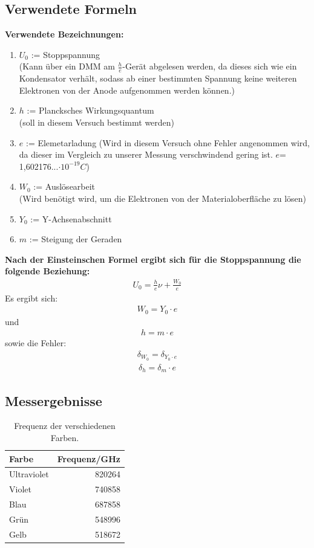 \documentclass[12px]{scrartcl}
\begin{document}
\subsection{Verwendete Formeln}
\textbf{Verwendete Bezeichnungen:}
\begin{enumerate}
\item $U_0$ := Stoppspannung\\ (Kann über ein DMM am $\frac{h}{e}$-Gerät abgelesen werden, da dieses sich wie ein Kondensator verhält, sodass ab einer bestimmten Spannung keine weiteren Elektronen von der Anode aufgenommen werden können.)
\item $h$ := Plancksches Wirkungsquantum\\
(soll in diesem Versuch bestimmt werden)
\item $e$ := Elemetarladung
(Wird in diesem Versuch ohne Fehler angenommen wird, da dieser im Vergleich zu unserer Messung verschwindend gering ist. $e$= 1,602176...$\cdot10^{-19}C$)
\item $W_0$ := Auslösearbeit\\
(Wird benötigt wird, um die Elektronen von der Materialoberfläche zu lösen)
\item $Y_0$ := Y-Achsenabschnitt
\item $m$ := Steigung der Geraden

\end{enumerate}
\textbf{Nach der Einsteinschen Formel ergibt sich für die Stoppspannung die folgende Beziehung:}
\begin{align}
U_0 = \frac{h}{e}\nu + \frac{W_0}{e}
\label{enq:stop}
\end{align}
Es ergibt sich:
\begin{align}
W_0 = Y_0\cdot e
\end{align}
und
\begin{align}
h = m\cdot e
\end{align}
sowie die Fehler:
\begin{align}
\delta_{W_0} = \delta_{Y_0\cdot e}
\end{align}
\begin{align}
\delta_h = \delta_m\cdot e
\end{align}
\subsection{Messergebnisse}
\begin{table}[H]
\caption{Frequenz der verschiedenen Farben.}
\begin{center}
\begin{tabular}{|l|r|}
\hline
Farbe & \multicolumn{1}{l|}{Frequenz/GHz} \\ \hline
Ultraviolet & 820264 \\ \hline
Violet  & 740858 \\ \hline
Blau & 687858 \\ \hline
Grün & 548996 \\ \hline
Gelb & 518672 \\ \hline
\end{tabular}
\end{center}
\label{tab:frequenz}
\end{table}
\end{document}
